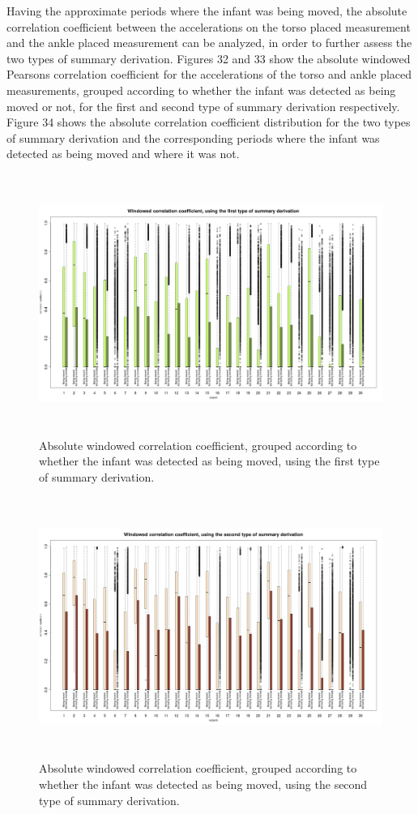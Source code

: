 \documentclass{article}
\begin{document}
{\newpage
Having the approximate periods where the infant was being moved, the absolute correlation coefficient between the accelerations on the torso placed measurement and the ankle placed measurement can be analyzed, in order to further assess the two types of summary derivation. Figures 32 and 33 show the absolute windowed Pearsons correlation coefficient for the accelerations of the torso and ankle placed measurements, grouped according to whether the infant was detected as being moved or not, for the first and second type of summary derivation respectively. Figure 34 shows the absolute correlation coefficient distribution for the two types of summary derivation and the corresponding periods where the infant was detected as being moved and where it was not.
\newpage
\begin{figure}[h!]
\includegraphics[width=15cm, height=8.5cm]{norm_result_being_moved_correlation_boxplot.png}
\caption{Absolute windowed correlation coefficient, grouped according to whether the infant was detected as being moved, using the first type of summary derivation.}
\end{figure}

\begin{figure}[h!]
\includegraphics[width=15cm, height=8.5cm]{filter_result_being_moved_correlation_boxplot.png}
\caption{Absolute windowed correlation coefficient, grouped according to whether the infant was detected as being moved, using the second type of summary derivation.}
\end{figure}
\newpage

}
\end{document}

